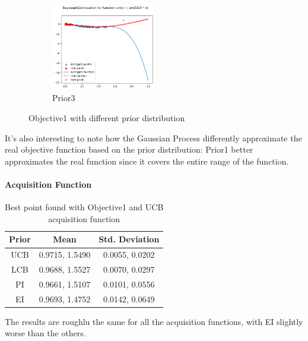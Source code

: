 \begin{figure}[H]
\begin{subfigure}{\textwidth}
        \centering
        \includegraphics[width=0.5\textwidth]{lab6/imgs/obj1_pr3.png}
        \caption{Prior3}
    \end{subfigure}
    \caption{Objective1 with different prior distribution}
    \label{fig:bo-prior}
\end{figure}
It's also interesting to note how the Gaussian Process differently approximate the real objective function based on the prior distribution: Prior1 better approximates the real function since it covers the entire range of the function.

\paragraph*{Acquisition Function}
\begin{table}[H]
    \centering
    \begin{tabular}{|c|c|c|}
        \textbf{Prior} & \textbf{Mean}  & \textbf{Std. Deviation} \\\hline
        UCB            & 0.9715, 1.5490 & 0.0055, 0.0202          \\
        LCB            & 0.9688, 1.5527 & 0.0070, 0.0297          \\
        PI             & 0.9661, 1.5107 & 0.0101, 0.0556          \\
        EI             & 0.9693, 1.4752 & 0.0142, 0.0649          \\
        \hline
    \end{tabular}
    \caption{Best point found with Objective1 and UCB acquisition function}
    \label{tab:acquisition}
\end{table}
The results are roughlu the same for all the acquisition functions, with EI slightly worse than the others.

